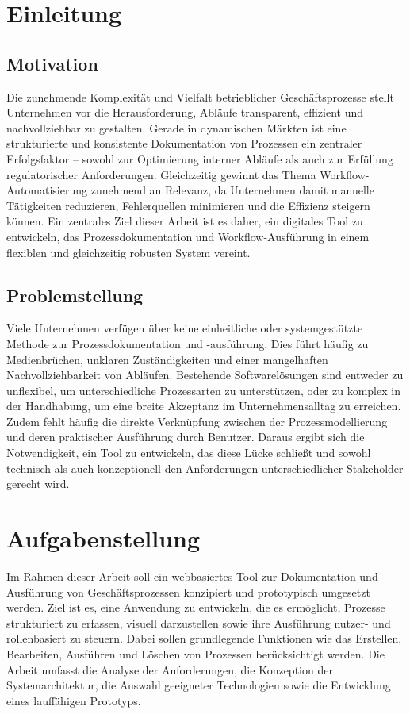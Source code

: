 


\chapter{Einleitung}
\section*{Motivation}
Die zunehmende Komplexität und Vielfalt betrieblicher Geschäftsprozesse stellt Unternehmen vor die Herausforderung, Abläufe transparent, effizient und nachvollziehbar zu gestalten. Gerade in dynamischen Märkten ist eine strukturierte und konsistente Dokumentation von Prozessen ein zentraler Erfolgsfaktor – sowohl zur Optimierung interner Abläufe als auch zur Erfüllung regulatorischer Anforderungen. Gleichzeitig gewinnt das Thema Workflow-Automatisierung zunehmend an Relevanz, da Unternehmen damit manuelle Tätigkeiten reduzieren, Fehlerquellen minimieren und die Effizienz steigern können. Ein zentrales Ziel dieser Arbeit ist es daher, ein digitales Tool zu entwickeln, das Prozessdokumentation und Workflow-Ausführung in einem flexiblen und gleichzeitig robusten System vereint.

\section*{Problemstellung}
Viele Unternehmen verfügen über keine einheitliche oder systemgestützte Methode zur Prozessdokumentation und -ausführung. Dies führt häufig zu Medienbrüchen, unklaren Zuständigkeiten und einer mangelhaften Nachvollziehbarkeit von Abläufen. Bestehende Softwarelösungen sind entweder zu unflexibel, um unterschiedliche Prozessarten zu unterstützen, oder zu komplex in der Handhabung, um eine breite Akzeptanz im Unternehmensalltag zu erreichen. Zudem fehlt häufig die direkte Verknüpfung zwischen der Prozessmodellierung und deren praktischer Ausführung durch Benutzer. Daraus ergibt sich die Notwendigkeit, ein Tool zu entwickeln, das diese Lücke schließt und sowohl technisch als auch konzeptionell den Anforderungen unterschiedlicher Stakeholder gerecht wird.


\chapter{Aufgabenstellung}
Im Rahmen dieser Arbeit soll ein webbasiertes Tool zur Dokumentation und Ausführung von Geschäftsprozessen konzipiert und prototypisch umgesetzt werden. Ziel ist es, eine Anwendung zu entwickeln, die es ermöglicht, Prozesse strukturiert zu erfassen, visuell darzustellen sowie ihre Ausführung nutzer- und rollenbasiert zu steuern. Dabei sollen grundlegende Funktionen wie das Erstellen, Bearbeiten, Ausführen und Löschen von Prozessen berücksichtigt werden. Die Arbeit umfasst die Analyse der Anforderungen, die Konzeption der Systemarchitektur, die Auswahl geeigneter Technologien sowie die Entwicklung eines lauffähigen Prototyps.

